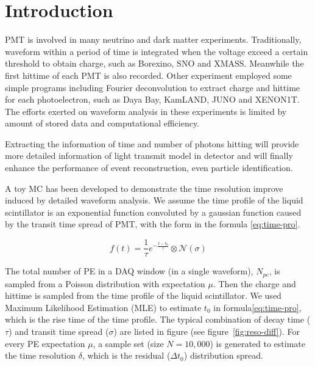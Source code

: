 \section{Introduction} %
PMT is involved in many neutrino and dark matter experiments. Traditionally, waveform within a period of time is integrated when the voltage exceed a certain threshold to obtain charge, such as Borexino\cite{lagomarsino_gateless_1999}, SNO\cite{dunger_event_2019} and XMASS\cite{abe_xmass_2013}. Meanwhile the first hittime of each PMT is also recorded. Other experiment employed some simple programs including Fourier deconvolution to extract charge and hittime for each photoelectron, such as Daya Bay\cite{huang_flash_2018}, KamLAND\cite{the_kamland_collaboration_production_2010}, JUNO\cite{zhang_comparison_2019} and XENON1T\cite{aprile_xenon1t_2019}. The efforts exerted on waveform analysis in these experiments is limited by amount of stored data and computational efficiency. 

Extracting the information of time and number of photons hitting will provide more detailed information of light transmit model in detector and will finally enhance the performance of event reconstruction, even particle identification. 

A toy MC has been developed to demonstrate the time resolution improve induced by detailed waveform analysis. We assume the time profile of the liquid scintillator is an exponential function convoluted by a gaussian function\cite{li_separation_2016} caused by the transit time spread of PMT, with the form in the formula \eqref{eq:time-pro}. 

\begin{equation}
    f(t) = \frac{1}{\tau}e^{-\frac{t - t_{0}}{\tau}} \otimes \mathcal{N}(\sigma)
    \label{eq:time-pro}
\end{equation}

The total number of PE in a DAQ window (in a single waveform), $N_{pe}$, is sampled from a Poisson distribution with expectation $\mu$. Then the charge and hittime is sampled from the time profile of the liquid scintillator. We used Maximum Likelihood Estimation (MLE) to estimate $t_{0}$ in formula\eqref{eq:time-pro}, which is the rise time of the time profile. The typical combination of decay time ($\tau$) and transit time spread ($\sigma$) are listed in figure (see figure~\ref{fig:reso-diff}). For every PE expectation $\mu$, a sample set (size $N=10,000$) is generated to estimate the time resolution $\delta$, which is the residual ($\Delta t_{0}$) distribution spread. 

